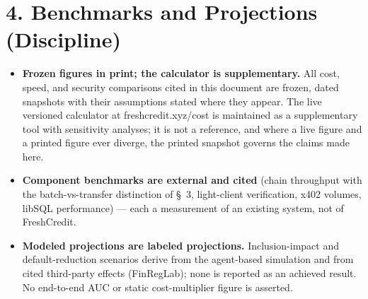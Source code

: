 \documentclass[11pt,twocolumn]{article}
\begin{document}
\section*{4. Benchmarks and Projections (Discipline)}

\begin{itemize}
\item \textbf{Frozen figures in print; the calculator is supplementary.} All cost, speed, and security comparisons cited in this document are frozen, dated snapshots with their assumptions stated where they appear. The live versioned calculator at freshcredit.xyz/cost is maintained as a supplementary tool with sensitivity analyses; it is not a reference, and where a live figure and a printed figure ever diverge, the printed snapshot governs the claims made here.
\item \textbf{Component benchmarks are external and cited} (chain throughput with the batch-vs-transfer distinction of \S~3, light-client verification, x402 volumes, libSQL performance) --- each a measurement of an existing system, not of FreshCredit.
\item \textbf{Modeled projections are labeled projections.} Inclusion-impact and default-reduction scenarios derive from the agent-based simulation and from cited third-party effects (FinRegLab); none is reported as an achieved result. No end-to-end AUC or static cost-multiplier figure is asserted.

\end{itemize}
\end{document}
